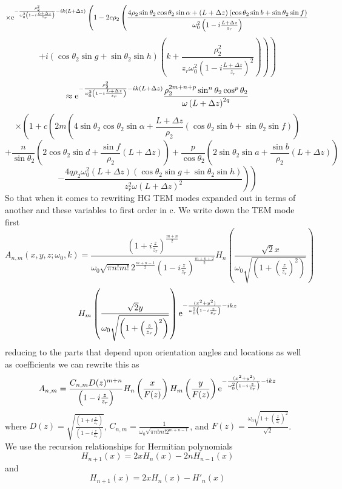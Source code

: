 \documentclass[11pt]{amsart}
\makeatletter
\newcommand{\e}{{\rm e}}				%
\newcommand{\0}{\varnothing}		%
\newcommand{\apr}{\approx}		%
\newcommand{\1}{!}
\newcommand{\2}{@}
\newcommand{\3}{\#}
\newcommand{\4}{\$}
\newcommand{\5}{\%}
\newcommand{\6}{$^\wedge$}
\newcommand{\7}{\&}
\newcommand{\8}{*}
\newcommand{\9}{(}
\makeatother
\begin{document}
\[
\times \e^{-\frac{\rho_2^2}{\omega_0^2\left(1-i\frac{L+\Delta z}{z_r}\right)}-ik\left(L+\Delta z\right)}\left(1-2c\rho_2\left(\frac{4\rho_2\sin \theta_2 \cos \theta_2\sin \alpha+\left(L+\Delta z\right)\left(\cos \theta_2\sin b+\sin \theta_2 \sin f\right)}{\omega_0^2\left(1-i\frac{L+\Delta z}{z_r}\right)}\right.\right.
\]
\[
\left. \left. +i\left(\cos \theta_2\sin g+\sin \theta_2 \sin h\right)\left(k+\frac{\rho_2^2}{z_r\omega_0^2\left(1-i\frac{L+\Delta z}{z_r}\right)^2}\right)\right)\right)
\]
\[
\apr \e^{-\frac{\rho_2^2}{\omega_0^2\left(1-i\frac{L+\Delta z}{z_r}\right)}-ik\left(L+\Delta z\right)}\frac{\rho_2^{2m+n+p}\sin^n\theta_2\cos^p\theta_2}{\omega\left(L+\Delta z\right)^{2q}}
\]
\[
\times \left(1+c\left(2m\left(4\sin \theta_2\cos\theta_2\sin\alpha+\frac{L+\Delta z}{\rho_2}\left(\cos \theta_2 \sin b+\sin \theta_2 \sin f\right)\right)\right.\right.
\]
\[
\left.\left.+\frac{n}{\sin\theta_2}\left(2\cos\theta_2\sin d + \frac{\sin f}{\rho_2}\left(L+\Delta z\right)\right)+\frac{p}{\cos\theta_2}\left(2\sin\theta_2\sin a+\frac{\sin b}{\rho_2}\left(L+\Delta z\right)\right)\right.\right.
\]
\[
\left.\left. -\frac{4q\rho_2\omega_0^2\left(L+\Delta z\right)\left(\cos \theta_2 \sin g + \sin \theta_2 \sin h\right)}{z_r^2\omega\left(L+\Delta z\right)^2}\right)\right)
\]
So that when it comes to rewriting HG TEM modes expanded out in terms of another and these variables to first order in c. We write down the TEM mode first
\[
A_{n,m}(x,y,z;\omega_0,k) = \frac{\left(1+i\frac{z}{z_r}\right)^{\frac{m+n}{2}}}{\omega_0\sqrt{\pi n! m!} 2^{\frac{m+n-1}{2}}\left(1-i\frac{z}{z_r}\right)^{\frac{m+n+2}{2}}}H_{n}\left(\frac{\sqrt{2}x}{\omega_0\sqrt{\left(1+\left(\frac{z}{z_r}\right)^{2}\right)}}\right)\]\[H_{m}\left(\frac{\sqrt{2}y}{\omega_0\sqrt{\left(1+\left(\frac{z}{z_r}\right)^{2}\right)}}\right)\e^{-\frac{(x^2+y^2)}{\omega_0^2\left(1-i\frac{z}{z_r}\right)}-ikz}
\]
reducing to the parts that depend upon orientation angles and locations as well as coefficients we can rewrite this as
\[
A_{n,m} = \frac{C_{n,m}D(z)^{m+n}}{\left(1-i\frac{z}{z_r}\right)}H_n\left(\frac{x}{F(z)}\right)H_m\left(\frac{y}{F(z)}\right)\e^{-\frac{(x^2+y^2)}{\omega_0^2\left(1-i\frac{z}{z_r}\right)}-ikz}
\]
where $D(z) = \sqrt{\frac{\left(1+i\frac{z}{z_r}\right)}{\left(1-i\frac{z}{z_r}\right)}}$, $C_{n,m} = \frac{1}{\omega_0\sqrt{\pi n! m! 2^{m+n-1}}}$, and $F(z) = \frac{\omega_0\sqrt{1+\left(\frac{z}{z_r}\right)^2}}{\sqrt{2}}$.
\\
We use the recursion relationships for Hermitian polynomials
\[
H_{n+1}(x) = 2xH_n(x)-2nH_{n-1}(x)
\]
and
\[
H_{n+1}(x) = 2xH_n(x)-H'_n(x)
\]
\end{document}
